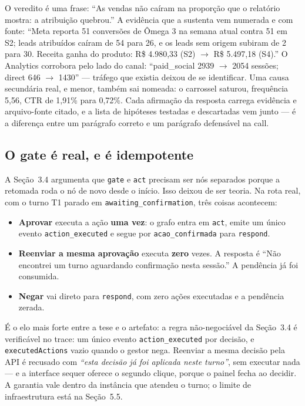 \documentclass[10pt,twocolumn]{article}
\newcommand{\code}[1]{\texttt{\footnotesize #1}}
\begin{document}
O veredito é uma frase: ``As vendas não caíram na proporção que o relatório mostra: a
atribuição quebrou.'' A evidência que a sustenta vem numerada e com fonte: ``Meta reporta 51
conversões de Ômega 3 na semana atual contra 51 em S2; leads atribuídos caíram de 54 para
26, e os leads sem origem subiram de 2 para 30. Receita ganha do produto: R\$ 4.980,33 (S2)
$\rightarrow$ R\$ 5.497,18 (S4).'' O Analytics corrobora pelo lado do canal: ``paid\_social
2939 $\rightarrow$ 2054 sessões; direct 646 $\rightarrow$ 1430'' --- tráfego que existia
deixou de se identificar. Uma causa secundária real, e menor, também sai nomeada: o
carrossel saturou, frequência 5,56, CTR de 1,91\% para 0,72\%. Cada afirmação da resposta
carrega evidência e arquivo-fonte citado, e a lista de hipóteses testadas e descartadas vem
junto --- é a diferença entre um parágrafo correto e um parágrafo defensável na call.

\subsection{O gate é real, e é idempotente}

A Seção~3.4 argumenta que \code{gate} e \code{act} precisam ser nós separados porque a
retomada roda o nó de novo desde o início. Isso deixou de ser teoria. Na rota real, com o
turno T1 parado em \code{awaiting\_confirmation}, três coisas acontecem:

\begin{itemize}\itemsep2pt
\item \textbf{Aprovar} executa a ação \textbf{uma vez}: o grafo entra em \code{act}, emite um
único evento \code{action\_executed} e segue por \code{acao\_confirmada} para \code{respond}.
\item \textbf{Reenviar a mesma aprovação} executa \textbf{zero} vezes. A resposta é ``Não
encontrei um turno aguardando confirmação nesta sessão.'' A pendência já foi consumida.
\item \textbf{Negar} vai direto para \code{respond}, com zero ações executadas e a pendência
zerada.
\end{itemize}

É o elo mais forte entre a tese e o artefato: a regra não-negociável da Seção~3.4 é
verificável no trace: um único evento \code{action\_executed} por decisão, e
\code{executedActions} vazio quando o gestor nega. Reenviar a mesma decisão pela API é
recusado com \emph{``esta decisão já foi aplicada neste turno''}, sem executar nada --- e a
interface sequer oferece o segundo clique, porque o painel fecha ao decidir. A garantia vale
dentro da instância que atendeu o turno; o limite de infraestrutura está na Seção~5.5.
\end{document}
